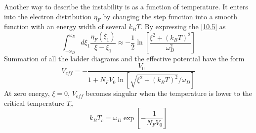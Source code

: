 Another way to describe the instability is as a function of temperature.
It enters into the electron distribution $\eta_F$ by changing the step function into a smooth function with an energy width of several $k_B T$.
By expressing the \eqref{10.5} as
\begin{equation}
    \int_{-\omega_D}^{\omega_D} d\xi_1 \frac{\eta_F(\xi_1)}{\xi-\xi_1} \approx  - \frac{1}{2} \ln \left[ \frac{\xi^2 + (k_B T)^2}{\omega_D^2}  \right] \label{10.12}
\end{equation}
Summation of all the ladder diagrams and the effective potential have the form
\begin{equation}
    V_{eff} = - \frac{V_0}{1+ N_F V_0 \ln \left[ \sqrt{\xi^2 + (k_BT)^2}/\omega_D  \right]}     \label{10.13}
\end{equation}
At zero energy, $\xi=0$, $V_{eff}$ becomes singular when the temperature is lower to the critical temperature $T_c$
\begin{equation}
    k_B T_c = \omega_D \exp \left[ - \frac{1}{N_F V_0} \right]  \label{10.14}
\end{equation}


